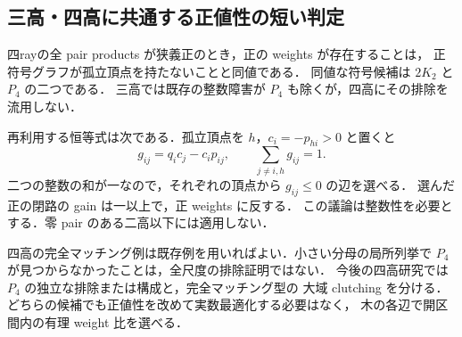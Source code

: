 \subsection{三高・四高に共通する正値性の短い判定}
\label{nf24:positive-graph}

四rayの全 pair products が狭義正のとき，正の weights が存在することは，
正符号グラフが孤立頂点を持たないことと同値である．
同値な符号候補は $2K_2$ と $P_4$ の二つである．
三高では既存の整数障害が $P_4$ も除くが，四高にその排除を流用しない．

再利用する恒等式は次である．孤立頂点を $h$，$c_i=-p_{hi}>0$ と置くと
\[
 g_{ij}=q_i c_j-c_i p_{ij},\qquad
 \sum_{j\ne i,h}g_{ij}=1.
\]
二つの整数の和が一なので，それぞれの頂点から $g_{ij}\le0$ の辺を選べる．
選んだ正の閉路の gain は一以上で，正 weights に反する．
この議論は整数性を必要とする．零 pair のある二高以下には適用しない．

四高の完全マッチング例は既存例を用いればよい．小さい分母の局所列挙で
$P_4$ が見つからなかったことは，全尺度の排除証明ではない．
今後の四高研究では $P_4$ の独立な排除または構成と，完全マッチング型の
大域 clutching を分ける．どちらの候補でも正値性を改めて実数最適化する必要はなく，
木の各辺で開区間内の有理 weight 比を選べる．
